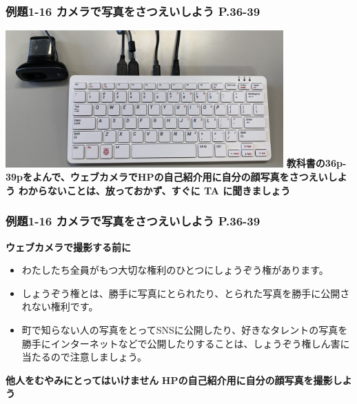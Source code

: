 \documentclass[dvipdfmx]{beamer}
\begin{document}
\begin{frame}[fragile]
	\frametitle{例題1-16 カメラで写真をさつえいしよう P.36-39~~~}
    \includegraphics[width=0.8\textwidth]{slide03_003.jpg}
    \vfill
    \large\textbf{教科書の36p-39pをよんで、ウェブカメラでHPの自己紹介用に自分の顔写真をさつえいしよう}
    \vfill
    \large\textbf{わからないことは、放っておかず、すぐに TA に聞きましょう}
\end{frame}

\begin{frame}[fragile]
	\frametitle{例題1-16 カメラで写真をさつえいしよう P.36-39~~~}
    \large\textbf{ウェブカメラで撮影する前に}
    \begin{itemize}
      \item わたしたち全員がもつ大切な権利のひとつにしょうぞう権があります。
      \item しょうぞう権とは、勝手に写真にとられたり、とられた写真を勝手に公開されない権利です。
      \item 町で知らない人の写真をとってSNSに公開したり、好きなタレントの写真を勝手にインターネットなどで公開したりすることは、しょうぞう権しん害に当たるので注意しましょう。
    \end{itemize}
    \vfill
    \large\textbf{他人をむやみにとってはいけません}
    \vfill
    \large\textbf{HPの自己紹介用に自分の顔写真を撮影しよう}
\end{frame}
\end{document}
